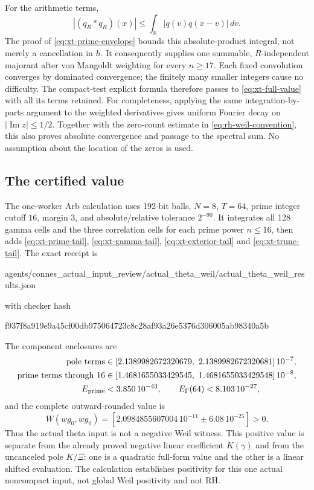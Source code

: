 For the arithmetic terms,
\[
 |(q_R*q_R)(x)|\le
 \int_{\mathbb R}|q(v)q(x-v)|\,dv.
\]
The proof of \eqref{eq:xt-prime-envelope} bounds this absolute-product
integral, not merely a cancellation in \(h\). It consequently supplies
one summable, \(R\)-independent majorant after von Mangoldt weighting
for every \(n\ge17\). Each fixed convolution converges by dominated
convergence; the finitely many smaller integers cause no difficulty.
The compact-test explicit formula therefore passes to
\eqref{eq:xt-full-value} with all its terms retained.
For completeness, applying the same integration-by-parts argument to
the weighted derivatives gives uniform Fourier decay on
\(|\operatorname{Im}z|\le1/2\). Together with the zero-count estimate
in \eqref{eq:rh-weil-convention}, this also proves absolute convergence
and passage to the spectral sum. No assumption about the location of
the zeros is used.

\subsection{The certified value}

The one-worker Arb calculation uses 192-bit balls, \(N=8\), \(T=64\), prime
integer cutoff \(16\), margin \(3\), and absolute/relative tolerance \(2^{-90}\).
It integrates all 128 gamma cells and the three correlation cells for each
prime power \(n\le16\), then adds \eqref{eq:xt-prime-tail},
\eqref{eq:xt-gamma-tail}, \eqref{eq:xt-exterior-tail} and
\eqref{eq:xt-trunc-tail}. The exact receipt is
\begin{center}\small\ttfamily
agents/connes\_actual\_input\_review/actual\_theta\_weil/actual\_theta\_weil\_results.json
\end{center}
with checker hash
\begin{center}\small\ttfamily
f937f8a919e9a45cf00db975064723c8c28af93a26e5376d306005ab98340a5b
\end{center}
The component enclosures are
\[
 \begin{aligned}
 \text{pole terms}&\in[2.1389982672320679,\ 2.1389982672320681]\,10^{-7},\\
 \text{prime terms through }16&\in[1.4681655033429545,\ 1.4681655033429548]\,10^{-8},\\
 E_{\rm prime}&<3.850\,10^{-43},\qquad E_\Gamma(64)<8.103\,10^{-27},
 \end{aligned}
\]
and the complete outward-rounded value is
\begin{equation}\label{eq:xt-result}
 W(wg_0,wg_0)=[2.0984855607004\,10^{-11}\pm6.08\,10^{-25}]>0.
\end{equation}
Thus the actual theta input is not a negative Weil witness. This positive
value is separate from the already proved negative linear coefficient
\(K(\gamma)\) and from the uncanceled pole \(K/\Xi\): one is a quadratic
full-form value and the other is a linear shifted evaluation. The
calculation establishes positivity for this one actual noncompact input,
not global Weil positivity and not RH.
